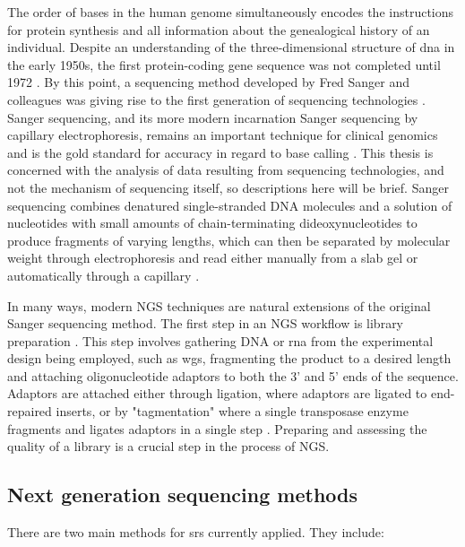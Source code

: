 The order of bases in the human genome simultaneously encodes the instructions for protein synthesis and all information about the genealogical history of an individual. Despite an understanding of the three-dimensional structure of \gls{dna} in the early 1950s, the first protein-coding gene sequence was not completed until 1972 \cite{JD1953,JOU1972}. By this point, a sequencing method developed by Fred Sanger and colleagues was giving rise to the first generation of sequencing technologies \cite{Kulkarni2014}. Sanger sequencing, and its more modern incarnation Sanger sequencing by capillary electrophoresis, remains an important technique for clinical genomics and is the gold standard for accuracy in regard to base calling \cite{Shendure2017}. This thesis is concerned with the analysis of data resulting from sequencing technologies, and not the mechanism of sequencing itself, so descriptions here will be brief. Sanger sequencing combines denatured single-stranded DNA molecules and a solution of nucleotides with small amounts of chain-terminating dideoxynucleotides to produce fragments of varying lengths, which can then be separated by molecular weight through electrophoresis and read either manually from a slab gel or automatically through a capillary \cite{F1977,Liu2012}. 

In many ways, modern NGS techniques are natural extensions of the original Sanger sequencing method. The first step in an NGS workflow is library preparation \cite{Head2018}. This step involves gathering DNA or \gls{rna} from the experimental design being employed, such as \gls{wgs}, fragmenting the product to a desired length and attaching oligonucleotide adaptors to both the 3' and 5' ends of the sequence. Adaptors are attached either through ligation, where adaptors are ligated to end-repaired inserts, or by "tagmentation" where a single transposase enzyme fragments and ligates adaptors in a single step \cite{R2011}. Preparing and assessing the quality of a library is a crucial step in the process of NGS. 

\subsection{Next generation sequencing methods} \label{intro:ngs_methods}

There are two main methods for \gls{srs} currently applied. They include:

